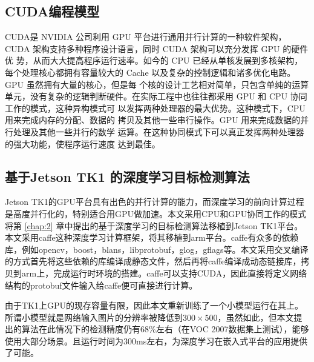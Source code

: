\subsection{CUDA编程模型}
CUDA是 NVIDIA 公司利用 GPU 平台进行通用并行计算的一种软件架构， CUDA 架构支持多种程序设计语言，同时 CUDA 架构可以充分发挥 GPU 的硬件优 势，从而大大提高程序运行速率。如今的 CPU 已经从单核发展到多核架构，每个处理核心都拥有容量较大的 Cache 以及复杂的控制逻辑和诸多优化电路。GPU 虽然拥有大量的核心，但是每 个核的设计工艺相对简单，只包含单纯的运算单元，没有复杂的逻辑判断硬件。在实际工程中也往往都采用 GPU 和 CPU 协同工作的模式，这种异构模式可 以发挥两种处理器的最大优势。这种模式下，CPU 用来完成内存的分配、数据的 拷贝及其他一些串行操作。GPU 用来完成数据的并行处理及其他一些并行的数学 运算。在这种协同模式下可以真正发挥两种处理器的强大功能，使程序运行速度 达到最佳。

\subsection{基于Jetson TK1 的深度学习目标检测算法}
Jetson TK1的GPU平台具有出色的并行计算的能力，而深度学习的前向计算过程是高度并行化的，特别适合用GPU做加速。本文采用CPU和GPU协同工作的模式将第 \ref{chap:2} 章中提出的基于深度学习的目标检测算法移植到Jetson TK1平台。本文采用caffe这种深度学习计算框架，将其移植到arm平台。caffe有众多的依赖库，例如opencv，boost，blans，libprotobuf，glog，gflags等。本文采用交叉编译的方式首先将这些依赖的库编译成静态文件，然后再将caffe编译成动态链接库，拷贝到arm上，完成运行时环境的搭建。caffe可以支持CUDA，因此直接将定义网络结构的protobuf文件输入给caffe便可直接进行计算。

由于TK1上GPU的现存容量有限，因此本文重新训练了一个小模型运行在其上。所谓小模型就是网络输入图片的分辨率被降低到$300\times500$，虽然如此，但本文提出的算法在此情况下的检测精度仍有68\%左右（在VOC 2007数据集上测试），能够使用大部分场景。且运行时间为300ms左右，为深度学习在嵌入式平台的应用提供了可能。